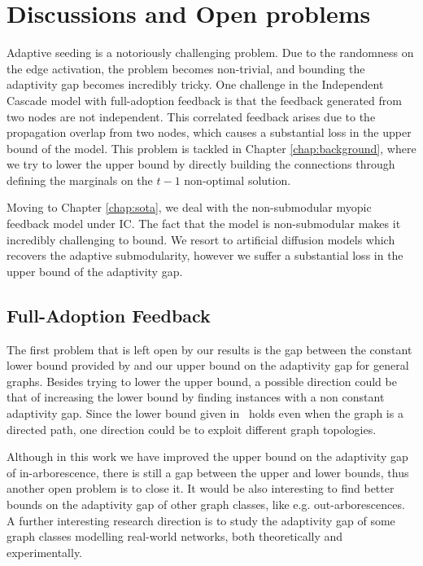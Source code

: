 \section{Discussions and Open problems} \label{sec:prob}

Adaptive seeding is a notoriously challenging problem. Due to the randomness on the edge activation, the problem becomes non-trivial, and bounding the adaptivity gap becomes incredibly tricky. One challenge in the Independent Cascade model with full-adoption feedback is that the feedback generated from two nodes are not independent. This correlated feedback arises due to the propagation overlap from two nodes, which causes a substantial loss in the upper bound of the model. This problem is tackled in Chapter \ref{chap:background}, where we try to lower the upper bound by directly building the connections through defining the marginals on the $t-1$ non-optimal solution. 

Moving to Chapter \ref{chap:sota}, we deal with the non-submodular myopic feedback model under IC. The fact that the model is non-submodular makes it incredibly challenging to bound. We resort to artificial diffusion models which recovers the adaptive submodularity, however we suffer a substantial loss in the upper bound of the adaptivity gap. 
 
\subsection{Full-Adoption Feedback}\label{full}


The first problem that is left open by our results is the gap between the constant lower bound provided by \citet{Chen2019} and our upper bound on the adaptivity gap for general graphs.
Besides trying to lower the upper bound, a possible direction could be that of increasing the lower bound by finding instances with a non constant adaptivity gap. Since the lower bound given in~\cite{Chen2019} holds even when the graph is a directed path, one direction could be to exploit different graph topologies. 

Although in this work we have improved the upper bound on the adaptivity gap of in-arborescence, there is still a gap between the upper and lower bounds, thus another open problem is to close it. It would be also interesting to find better bounds on the adaptivity gap of other graph classes, like e.g. out-arborescences. A further interesting research direction is to study the adaptivity gap of some graph classes modelling real-world networks, both theoretically and experimentally. 


